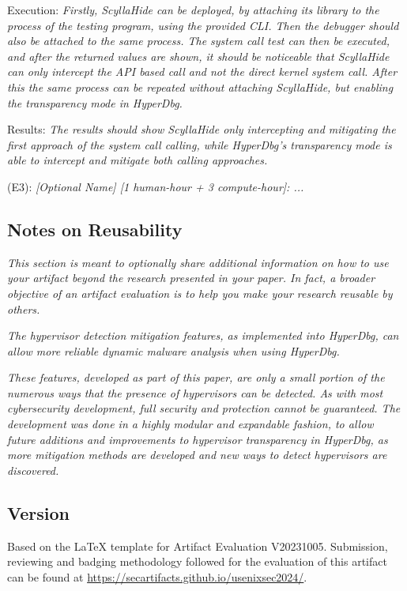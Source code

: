 \begin{compactdesc}
\begin{asparadesc}
        \item[Execution:]  \textit{Firstly, ScyllaHide can be deployed, by attaching its library to the process of the testing program, using the provided CLI. Then the debugger should also be attached to the same 
        process. The system call test can then be executed, and after the returned values are shown, it should be noticeable  that ScyllaHide can only intercept the API based call and not the direct kernel system call.
        After this the same process can be repeated without attaching ScyllaHide, but enabling the transparency mode in HyperDbg.}
        
        \item[Results:] \textit{The results should show ScyllaHide only intercepting and mitigating the first approach of the system call calling, while HyperDbg's transparency mode is able to intercept and mitigate both
        calling approaches.}
    \end{asparadesc}

    \item[(E3):] \textit{[Optional Name] [1 human-hour + 3 compute-hour]: ...}

\end{compactdesc}

\subsection{Notes on Reusability}
\label{sec:reuse}
\textit{This section is meant to optionally share additional
information on how to use your artifact beyond the research presented in your
paper. In fact, a broader objective of an artifact evaluation is to help you
make your research reusable by others.}

\textit{The hypervisor detection mitigation features, as implemented into HyperDbg, can allow more reliable dynamic malware analysis when using HyperDbg.}

\textit{These features, developed as part of this paper, are only a small portion
of the numerous ways that the presence of hypervisors can be detected. As with most cybersecurity development, 
full security and protection cannot be guaranteed. The development was done in a highly modular and expandable fashion, 
to allow future additions and improvements to hypervisor transparency in HyperDbg, as more mitigation methods are developed and new ways to detect hypervisors are discovered.}


\subsection{Version}
Based on the LaTeX template for Artifact Evaluation V20231005. Submission,
reviewing and badging methodology followed for the evaluation of this artifact
can be found at \url{https://secartifacts.github.io/usenixsec2024/}.